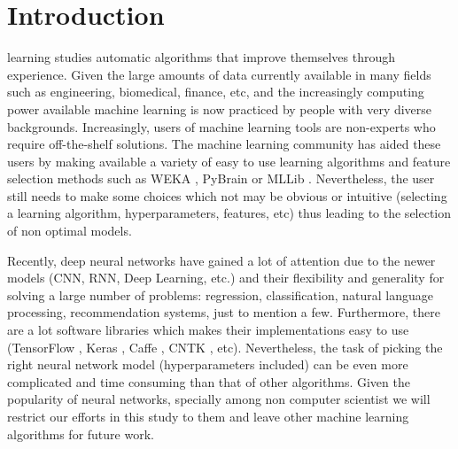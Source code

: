 \documentclass[journal]{IEEEtran}
\begin{document}
%



\section{Introduction}
% 
% 
% 
% 
 learning studies automatic algorithms that improve themselves through experience. Given the large amounts of data currently available in many fields such as engineering, biomedical, finance, etc, and the increasingly computing power available machine learning is now  practiced by people with very diverse backgrounds. Increasingly, users of machine learning tools are non-experts who require off-the-shelf solutions. The machine learning community has aided these users by making available a variety of easy to use learning algorithms and feature selection methods such as WEKA \cite{Hall2009}, PyBrain \cite{Schaul2010} or MLLib \cite{mlib2017}. Nevertheless, the user still needs to make some choices which not may be obvious or intuitive (selecting a learning algorithm, hyperparameters, features, etc) thus leading to the selection of non optimal models.

Recently, deep neural networks have gained a lot of attention due to the newer models (CNN, RNN, Deep Learning, etc.) and their flexibility and generality for solving a large number of problems: regression, classification, natural language processing, recommendation systems, just to mention a few. Furthermore, there are a lot software libraries which makes their implementations easy to use (TensorFlow \cite{TensorFlow2015}, Keras \cite{keras2015}, Caffe \cite{caffe2014}, CNTK \cite{cntk2016}, etc). Nevertheless, the task of picking the right neural network model (hyperparameters included) can be even more complicated and time consuming than that of other algorithms. Given the popularity of neural networks, specially among non computer scientist we will restrict our efforts in this study to them and leave other machine learning algorithms for future work.
\end{document}
